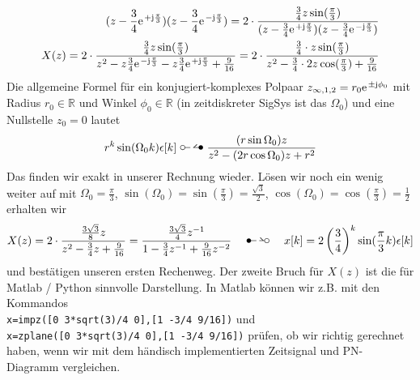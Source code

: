 \begin{mdframed}
\begin{align}
{(z-\frac{3}{4}\e^{+\im\frac{\pi}{3}})(z-\frac{3}{4}\e^{-\im\frac{\pi}{3}})}=
2 \cdot \frac{\frac{3}{4} z \sin(\frac{\pi}{3})}
{(z-\frac{3}{4}\e^{+\im\frac{\pi}{3}})(z-\frac{3}{4}\e^{-\im\frac{\pi}{3}})}
%
\\
X(z) =
2 \cdot \frac{\frac{3}{4} z \sin(\frac{\pi}{3})}
{z^2 - z \frac{3}{4}\e^{-\im\frac{\pi}{3}} - z \frac{3}{4}\e^{+\im\frac{\pi}{3}} + \frac{9}{16}}=
2 \cdot \frac{\frac{3}{4} \cdot z \sin(\frac{\pi}{3})}
{z^2 - \frac{3}{4} \cdot 2 z \cos(\frac{\pi}{3}) + \frac{9}{16}}
\end{align}
Die allgemeine Formel für ein konjugiert-komplexes Polpaar
$z_{\infty,1,2} = r_0 \e^{\pm \im \phi_0}$ mit Radius $r_0\in\mathbb{R}$ und
Winkel $\phi_0\in\mathbb{R}$ (in zeitdiskreter SigSys ist das $\Omega_0$)
und eine Nullstelle $z_0 = 0$ lautet
\begin{align}
r^k \sin(\Omega_0 k)\epsilon[k] \ztransf \frac{(r\sin\Omega_0)z}{z^2 -(2r\cos\Omega_0)z + r^2}
\end{align}
Das finden wir exakt in unserer Rechnung wieder.
%
Lösen wir noch ein wenig weiter auf mit
$\Omega_0 = \frac{\pi}{3}$,
$\sin(\Omega_0)=\sin(\frac{\pi}{3}) = \frac{\sqrt{3}}{2}$,
$\cos(\Omega_0)=\cos(\frac{\pi}{3}) = \frac{1}{2}$
erhalten wir
\begin{align}
X(z) =
2 \cdot \frac{\frac{3\sqrt{3}}{8} z}
{z^2 - \frac{3}{4}z + \frac{9}{16}}
=
\frac{\frac{3\sqrt{3}}{4} z^{-1}}
{1 - \frac{3}{4}z^{-1} + \frac{9}{16} z^{-2}}
\quad \Ztransf \quad
x[k] = 2 \left(\frac{3}{4}\right)^k \sin(\frac{\pi}{3} k) \epsilon[k]
\end{align}
und bestätigen unseren ersten Rechenweg.
Der zweite Bruch für $X(z)$ ist die für Matlab / Python sinnvolle Darstellung. In Matlab
können wir z.B. mit den Kommandos
\\\texttt{x=impz([0 3*sqrt(3)/4 0],[1 -3/4 9/16])}
und
\\\texttt{x=zplane([0 3*sqrt(3)/4 0],[1 -3/4 9/16])}
prüfen, ob wir richtig gerechnet haben, wenn wir mit dem händisch implementierten
Zeitsignal und PN-Diagramm vergleichen.
\end{mdframed}



\newpage

